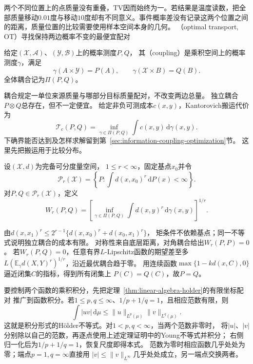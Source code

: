 两个不同位置上的点质量没有重叠，TV因而始终为一。若结果是温度读数，把全部质量移动\(0.01\)度与移动\(10\)度却有不同意义。事件概率差没有记录这两个位置之间的距离，质量位置的比较需要使用样本空间本身的几何。
（optimal transport, OT）寻找保持两边概率不变的最便宜配对

\begin{definition}[耦合]
\label{def:information-coupling}
给定\((\mathcal X,\mathcal A)\)、\((\mathcal Y,\mathcal B)\)上的概率测度\(P,Q\)，
其（coupling）是乘积空间上的概率测度\(\gamma\)，满足
\[
  \gamma(A\times\mathcal Y)=P(A),\qquad
  \gamma(\mathcal X\times B)=Q(B).
\]
全体耦合记为\(\Pi(P,Q)\)。
\end{definition}
耦合规定一单位来源质量与哪部分目标质量配对，不改变两边总量。
独立耦合\(P\otimes Q\)总存在，但不一定便宜。
给定非负可测成本\(c(x,y)\)，Kantorovich搬运代价为
\begin{equation}
  \mathcal T_c(P,Q)=\inf_{\gamma\in\Pi(P,Q)}
                      \int c(x,y)\,\mathrm d\gamma(x,y).
  \label{eq:information-kantorovich-transport}
\end{equation}
下确界能否达到及怎样求解留到第~\ref{sec:information-coupling-optimization}节。
这里先把搬运用于比较分布。

\begin{definition}[Wasserstein距离]
\label{def:information-wasserstein-distance}
设\((\mathcal X,d)\)为完备可分度量空间，
\(1\leq r<\infty\)，固定基点\(x_0\)并令
\[
  \mathcal P_r(\mathcal X)=
   \left\{P:\int d(x,x_0)^r\,\mathrm dP(x)<\infty\right\}.
\]
对\(P,Q\in\mathcal P_r(\mathcal X)\)，定义
\begin{equation}
  W_r(P,Q)=\left[
    \inf_{\gamma\in\Pi(P,Q)}\int d(x,y)^r\,\mathrm d\gamma(x,y)
  \right]^{1/r}.
  \label{eq:information-wasserstein-distance}
\end{equation}
\end{definition}

由\(d(x,x_1)^r\leq2^{r-1}\{d(x,x_0)^r+d(x_0,x_1)^r\}\)，
矩条件不依赖基点；同一不等式说明独立耦合的成本有限。
对称性来自底层距离，对角耦合给出\(W_r(P,P)=0\)。
若\(W_r(P,Q)=0\)，任意有界\(L\)-Lipschitz函数的期望差至多
\(L(\mathbb E_\gamma d(X,Y)^r)^{1/r}\)，沿近最优耦合趋于零。
用连续函数\(\max\{1-kd(x,C),0\}\)逼近闭集\(C\)的指标，得到所有闭集上
\(P(C)=Q(C)\)，故\(P=Q\)。

要控制两个函数的乘积积分，先把定理~\ref{thm:linear-algebra-holder}的有限坐标配对
推广到函数积分。若\(1\leq p,q\leq\infty\)、\(1/p+1/q=1\)，且相应范数有限，则
\begin{equation}
 \int|uv|\,\mathrm d\mu\leq
 \|u\|_{L^p(\mu)}\|v\|_{L^q(\mu)}.
 \label{eq:information-integral-holder}
\end{equation}
这就是积分形式的Hölder不等式。对\(1<p,q<\infty\)，当两个范数非零时，
将\(|u|\)、\(|v|\)分别除以自己的范数，再逐点使用上述定理证明中的Young不等式并积分；
右侧归一化后为\(1/p+1/q=1\)，恢复尺度即得本式。
范数为零时相应函数几乎处处为零；端点\(p=1,q=\infty\)直接用
\(|v|\leq\|v\|_{L^\infty}\)几乎处处成立，另一端点交换两者。

